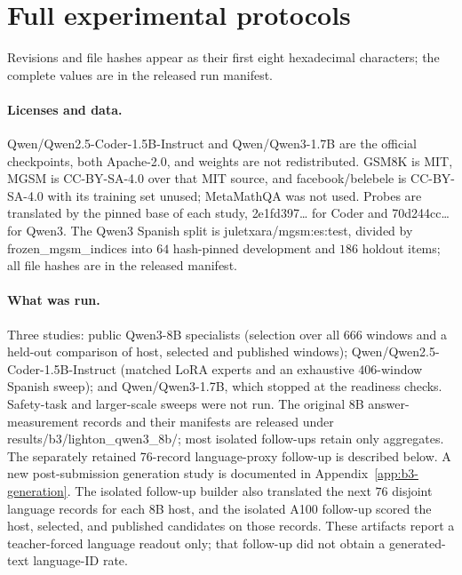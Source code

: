 \documentclass{article}
\newcommand{\artifact}[1]{\textsf{#1}}
\theoremstyle{plain}
\theoremstyle{definition}
\theoremstyle{remark}
\begin{document}
\section{Full experimental protocols}
\label{app:protocol}

Revisions and file hashes appear as their first eight hexadecimal characters;
the complete values are in the released run manifest.

\paragraph{Licenses and data.}
\artifact{Qwen/Qwen2.5-Coder-1.5B-Instruct} and \artifact{Qwen/Qwen3-1.7B} are
the official checkpoints, both Apache-2.0, and weights are not redistributed.
GSM8K is MIT, MGSM is CC-BY-SA-4.0 over that MIT source, and
\artifact{facebook/belebele} is CC-BY-SA-4.0 with its training set unused;
MetaMathQA was not used. Probes are translated by the pinned base of each study,
\artifact{2e1fd397}\ldots{} for Coder and \artifact{70d244cc}\ldots{} for Qwen3.
The Qwen3 Spanish split is \artifact{juletxara/mgsm:es:test}, divided by
\artifact{frozen\_mgsm\_indices} into $64$ hash-pinned development and $186$
holdout items; all file hashes are in the released manifest.

\paragraph{What was run.}
Three studies: public Qwen3-8B specialists (selection over all $666$ windows and
a held-out comparison of host, selected and published windows);
\artifact{Qwen/Qwen2.5-Coder-1.5B-Instruct} (matched LoRA experts and an
exhaustive $406$-window Spanish sweep); and \artifact{Qwen/Qwen3-1.7B}, which
stopped at the readiness checks. Safety-task and larger-scale sweeps were not
run. The original 8B answer-measurement records and their manifests are released under
\artifact{results/b3/lighton\_qwen3\_8b/}; most isolated follow-ups retain
only aggregates. The separately retained 76-record language-proxy follow-up
is described below. A new post-submission generation study is documented in
Appendix~\ref{app:b3-generation}.
The isolated follow-up builder also translated the next $76$ disjoint language
records for each 8B host, and the isolated A100 follow-up scored the host,
selected, and published candidates on those records. These artifacts report a
teacher-forced language readout only; that follow-up did not obtain a
generated-text language-ID rate.
\end{document}
